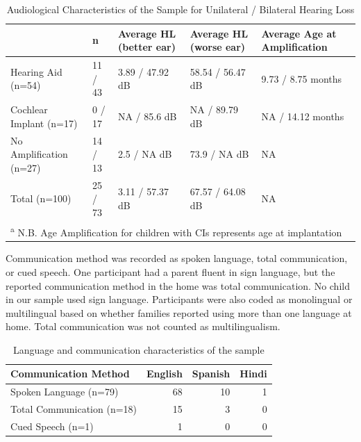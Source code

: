 \documentclass[english,man]{apa6}
\begin{document}
\begin{table}[!h]

\caption{\label{tab:amp-info}Audiological Characteristics of the Sample 
for Unilateral / Bilateral Hearing Loss}
\centering
\begin{tabular}[t]{l|l|l|l|l}
\hline
 & n & Average HL (better ear) & Average HL (worse ear) & Average Age at Amplification\\
\hline
Hearing Aid (n=54) & 11 / 43 & 3.89 / 47.92 dB & 58.54 / 56.47 dB & 9.73 / 8.75 months\\
\hline
Cochlear Implant (n=17) & 0 / 17 & NA / 85.6 dB & NA / 89.79 dB & NA / 14.12 months\\
\hline
No Amplification (n=27) & 14 / 13 & 2.5 / NA dB & 73.9 / NA dB & NA\\
\hline
Total (n=100) & 25 / 73 & 3.11 / 57.37 dB & 67.57 / 64.08 dB & NA\\
\hline
\multicolumn{5}{l}{\textsuperscript{a} N.B. Age Amplification for children with CIs represents age at implantation}\\
\end{tabular}
\end{table}

Communication method was recorded as spoken language, total communication, or cued speech. One participant had a parent fluent in sign language, but the reported communication method in the home was total communication. No child in our sample used sign language. Participants were also coded as monolingual or multilingual based on whether families reported using more than one language at home. Total communication was not counted as multilingualism.

\begin{table}[!h]

\caption{\label{tab:comm-info}Language and communication characteristics of the sample}
\centering
\begin{tabular}[t]{l|r|r|r}
\hline
Communication Method & English & Spanish & Hindi\\
\hline
Spoken Language (n=79) & 68 & 10 & 1\\
\hline
Total Communication (n=18) & 15 & 3 & 0\\
\hline
Cued Speech (n=1) & 1 & 0 & 0\\
\hline
\end{tabular}
\end{table}
\end{document}
